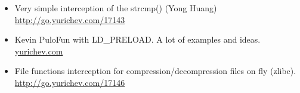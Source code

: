 \begin{itemize}

\item
Very simple interception of the strcmp() (Yong Huang) 
\url{http://go.yurichev.com/17143}

\item
Kevin Pulo\EMDASH{}Fun with LD\_PRELOAD. A lot of examples and ideas.
\href{http://go.yurichev.com/17145}{yurichev.com}

\item
File functions interception for compression/decompression files on fly (zlibc). \url{http://go.yurichev.com/17146}

\end{itemize}
